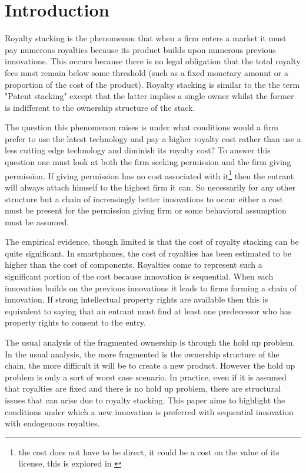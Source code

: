 \documentclass{article}
\begin{document}
\section{Introduction}

Royalty stacking is the phenomenon that when a firm enters a market it must pay numerous royalties because its product builds upon numerous previous innovations. This occurs because there is no legal obligation that the total royalty fees must remain below some threshold (such as a fixed monetary amount or a proportion of the cost of the product). Royalty stacking is similar to the the term "Patent stacking" except that the latter implies a single owner whilst the former is indifferent to the ownership structure of the stack. 

The question this phenomenon raises is under what conditions would a firm prefer to use the latest technology and pay a higher royalty cost rather than use a less cutting edge technology and diminish its royalty cost? To answer this question one must look at both the firm seeking permission and the firm giving permission. If giving permission has no cost associated with it\footnote{ the cost does not have to be direct, it could be a cost on the value of its license, this is explored in \cite{Katz1986}} then the entrant will always attach himself to the highest firm it can. So necessarily for any other structure but a chain of increasingly better innovations to occur either a cost must be present for the permission giving firm or some behavioral assumption must be assumed. 

The empirical evidence, though limited is that the cost of royalty stacking can be quite significant. In smartphones, the cost of royalties has been estimated to be higher than the cost of components. \cite{Armstrong2014} Royalties come to represent such a significant portion of the cost because innovation is sequential. When each innovation builds on the previous innovations it leads to firms forming a chain of innovation. If strong intellectual property rights are available then this is equivalent to saying that an entrant must find at least one predecessor who has property rights to consent to the entry. 

The usual analysis of the fragmented ownership is through the hold up problem.  In the usual analysis, the more fragmented is the ownership structure of the chain, the more difficult it will be to create a new product. However the hold up problem is only a sort of worst case scenario. In practice, even if it is assumed that royalties are fixed and there is no hold up problem, there are structural issues that can arise due to royalty stacking. This paper aims to highlight the conditions under which a new innovation is preferred with sequential innovation with endogenous royalties. 
\end{document}
